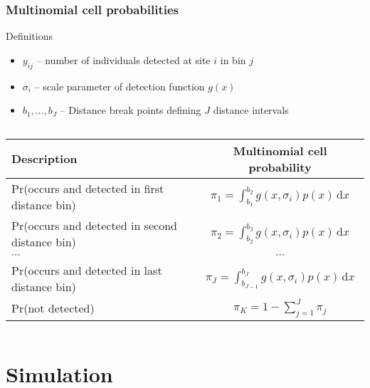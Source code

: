 \documentclass[color=usenames,dvipsnames]{beamer}\usepackage[]{graphicx}\usepackage[]{color}
\begin{document}
\begin{frame}
  \frametitle{Multinomial cell probabilities}
  \small
  Definitions
  \begin{itemize}
  \small
    \setlength\itemsep{1pt}
    \item $y_{ij}$ -- number of individuals detected at site $i$ in bin $j$
    \item $\sigma_i$ -- scale parameter of detection function $g(x)$
    \item $b_1, \dots, b_J$ -- Distance break points defining $J$ distance intervals
  \end{itemize}
  \pause \vfill
  \footnotesize
  \begin{columns}
    \column{0.9\paperwidth}
    \begin{tabular}{lc}
      \hline
      \centering
      Description                       & Multinomial cell probability \\
      \hline
      Pr(occurs and detected in first distance bin)  & $\pi_1 = \int_{b_1}^{b_2} g(x,\sigma_i)p(x)\, \mathrm{d}x$   \\
      Pr(occurs and detected in second distance bin)  & $\pi_2 = \int_{b_2}^{b_3} g(x,\sigma_i)p(x)\, \mathrm{d}x$   \\
      {\centering $\cdots$}             & $\cdots$                     \\
      Pr(occurs and detected in last distance bin)  & $\pi_J = \int_{b_{J-1}}^{b_J} g(x,\sigma_i)p(x)\, \mathrm{d}x$   \\
      Pr(not detected)                  & $\pi_{K} = 1-\sum_{j=1}^J \pi_j$          \\
      \hline
    \end{tabular}
  \end{columns}
\end{frame}








\section{Simulation}


\end{document}
